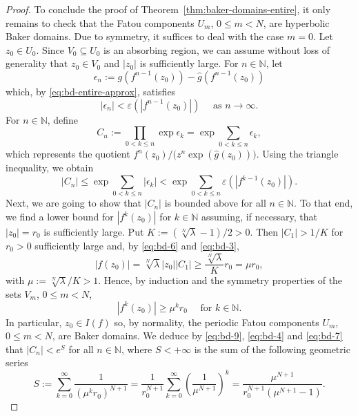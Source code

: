 \documentclass[a4paper, 12pt, reqno]{amsart}
\numberwithin{equation}{section}
\newcommand{\ds}{\displaystyle}
\theoremstyle{plain}
\theoremstyle{definition}
\theoremstyle{remark}
\newcommand{\N}{{\mathbb{N}}}
\begin{document}
\begin{proof}
To conclude the proof of Theorem~\ref{thm:baker-domains-entire}, it only remains to check that the Fatou components $U_m$, $0\leqslant m<N$, are hyperbolic Baker domains. Due to symmetry, it suffices to deal with the case $m=0$. Let $z_0\in U_0$. Since $V_0\subseteq U_0$ is an absorbing region, we can assume without loss of generality that $z_0\in V_0$ and $|z_0|$ is sufficiently large. For $n\in\N$, let 
$$
\epsilon_n:=g(f^{n-1}(z_0))-\hat{g}(f^{n-1}(z_0))
$$
which, by \eqref{eq:bd-entire-approx}, satisfies 
$$
|\epsilon_n|<\varepsilon(|f^{n-1}(z_0)|) \quad \mbox{ as } n\to \infty.
$$
For $n\in\N$, define 
$$
C_n:=\prod_{0<k\leqslant n} \exp \epsilon_k=\exp \sum_{0<k\leqslant n} \epsilon_k,
$$
which represents the quotient $f^n(z_0)/\bigl(z^n\exp(\hat{g}(z_0))\bigr)$. Using the triangle inequality, we obtain
\begin{equation}
|C_n|\leqslant \exp \sum_{0<k\leqslant n} |\epsilon_k|<\exp\sum_{0<k\leqslant n} \varepsilon(|f^{k-1}(z_0)|).
\label{eq:bd-9}
\end{equation}
Next, we are going to show that $|C_n|$ is bounded above for all $n\in\N$. To that end, we find a lower bound for $|f^{k}(z_0)|$ for $k\in\N$ assuming, if necessary, that $|z_0|=r_0$ is sufficiently large. Put $K:=(\sqrt[N]{\lambda}-1)/2>0$. Then $|C_1|>1/K$ for $r_0>0$ sufficiently large and, by \eqref{eq:bd-6} and \eqref{eq:bd-3},
$$
|f(z_0)|=\sqrt[N]{\lambda}|z_0||C_1|\geqslant \frac{\sqrt[N]{\lambda}}{K}r_0=\mu r_0,
$$
with $\mu:=\sqrt[N]{\lambda}/K>1$. Hence, by induction and the symmetry properties of the sets $V_m$, $0\leqslant m<N$,
\begin{equation}
|f^k(z_0)|\geqslant \mu^k r_0\quad \mbox{ for } k\in\N.
\label{eq:bd-7}
\end{equation}
In particular, $z_0\in I(f)$ so, by normality, the periodic Fatou components $U_m$, $0\leqslant m<N$, are Baker domains. We deduce by \eqref{eq:bd-9}, \eqref{eq:bd-4} and \eqref{eq:bd-7} that $|C_n|<e^S$ for all $n\in\N$, where $S<+\infty$ is the sum of the following geometric series
$$
S:=\sum_{k=0}^\infty \frac{1}{(\mu^kr_0)^{N+1}}=\frac{1}{r_0^{N+1}} \sum_{k=0}^\infty \left( \frac{1}{\mu^{N+1}} \right)^k =\frac{\mu^{N+1}}{r_0^{N+1}(\mu^{N+1}-1)}.
$$


\end{proof}
\end{document}
